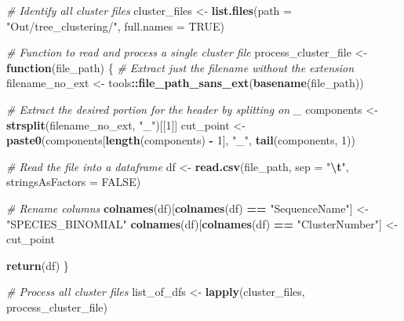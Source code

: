 \documentclass[
]{article}
\newenvironment{Shaded}{\begin{snugshade}}{\end{snugshade}}
\newcommand{\AttributeTok}[1]{\textcolor[rgb]{0.13,0.29,0.53}{#1}}
\newcommand{\CommentTok}[1]{\textcolor[rgb]{0.56,0.35,0.01}{\textit{#1}}}
\newcommand{\ConstantTok}[1]{\textcolor[rgb]{0.56,0.35,0.01}{#1}}
\newcommand{\ControlFlowTok}[1]{\textcolor[rgb]{0.13,0.29,0.53}{\textbf{#1}}}
\newcommand{\DecValTok}[1]{\textcolor[rgb]{0.00,0.00,0.81}{#1}}
\newcommand{\FunctionTok}[1]{\textcolor[rgb]{0.13,0.29,0.53}{\textbf{#1}}}
\newcommand{\NormalTok}[1]{#1}
\newcommand{\OtherTok}[1]{\textcolor[rgb]{0.56,0.35,0.01}{#1}}
\newcommand{\SpecialCharTok}[1]{\textcolor[rgb]{0.81,0.36,0.00}{\textbf{#1}}}
\newcommand{\StringTok}[1]{\textcolor[rgb]{0.31,0.60,0.02}{#1}}
\begin{document}
\begin{Shaded}
\begin{Highlighting}[]
\CommentTok{\# Identify all cluster files}
\NormalTok{cluster\_files }\OtherTok{\textless{}{-}} \FunctionTok{list.files}\NormalTok{(}\AttributeTok{path =} \StringTok{"Out/tree\_clustering/"}\NormalTok{, }\AttributeTok{full.names =} \ConstantTok{TRUE}\NormalTok{)}

\CommentTok{\# Function to read and process a single cluster file}
\NormalTok{process\_cluster\_file }\OtherTok{\textless{}{-}} \ControlFlowTok{function}\NormalTok{(file\_path) \{}
  \CommentTok{\# Extract just the filename without the extension}
\NormalTok{  filename\_no\_ext }\OtherTok{\textless{}{-}}\NormalTok{ tools}\SpecialCharTok{::}\FunctionTok{file\_path\_sans\_ext}\NormalTok{(}\FunctionTok{basename}\NormalTok{(file\_path))}
  
  \CommentTok{\# Extract the desired portion for the header by splitting on \textquotesingle{}\_\textquotesingle{}}
\NormalTok{  components }\OtherTok{\textless{}{-}} \FunctionTok{strsplit}\NormalTok{(filename\_no\_ext, }\StringTok{"\_"}\NormalTok{)[[}\DecValTok{1}\NormalTok{]]}
\NormalTok{  cut\_point }\OtherTok{\textless{}{-}} \FunctionTok{paste0}\NormalTok{(components[}\FunctionTok{length}\NormalTok{(components) }\SpecialCharTok{{-}} \DecValTok{1}\NormalTok{], }\StringTok{"\_"}\NormalTok{, }\FunctionTok{tail}\NormalTok{(components, }\DecValTok{1}\NormalTok{))}
  
  \CommentTok{\# Read the file into a dataframe}
\NormalTok{  df }\OtherTok{\textless{}{-}} \FunctionTok{read.csv}\NormalTok{(file\_path, }\AttributeTok{sep =} \StringTok{"}\SpecialCharTok{\textbackslash{}t}\StringTok{"}\NormalTok{, }\AttributeTok{stringsAsFactors =} \ConstantTok{FALSE}\NormalTok{)}
  
  \CommentTok{\# Rename columns}
  \FunctionTok{colnames}\NormalTok{(df)[}\FunctionTok{colnames}\NormalTok{(df) }\SpecialCharTok{==} \StringTok{"SequenceName"}\NormalTok{] }\OtherTok{\textless{}{-}} \StringTok{"SPECIES\_BINOMIAL"}
  \FunctionTok{colnames}\NormalTok{(df)[}\FunctionTok{colnames}\NormalTok{(df) }\SpecialCharTok{==} \StringTok{"ClusterNumber"}\NormalTok{] }\OtherTok{\textless{}{-}}\NormalTok{ cut\_point}
  
  \FunctionTok{return}\NormalTok{(df)}
\NormalTok{\}}

\CommentTok{\# Process all cluster files}
\NormalTok{list\_of\_dfs }\OtherTok{\textless{}{-}} \FunctionTok{lapply}\NormalTok{(cluster\_files, process\_cluster\_file)}


\end{Highlighting}
\end{Shaded}
\end{document}

